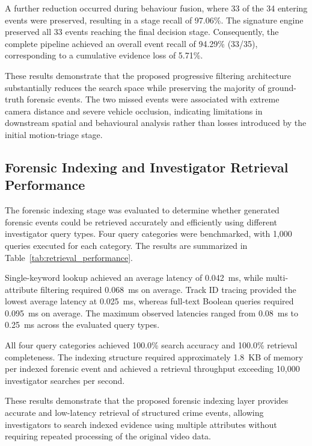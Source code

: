 \documentclass[conference]{IEEEtran}
\begin{document}
A further reduction occurred during behaviour fusion, where 33 of the
34 entering events were preserved, resulting in a stage recall of
97.06\%. The signature engine preserved all 33 events reaching the final
decision stage. Consequently, the complete pipeline achieved an overall
event recall of 94.29\% (33/35), corresponding to a cumulative evidence
loss of 5.71\%.

These results demonstrate that the proposed progressive filtering
architecture substantially reduces the search space while preserving
the majority of ground-truth forensic events. The two missed events were
associated with extreme camera distance and severe vehicle occlusion,
indicating limitations in downstream spatial and behavioural analysis
rather than losses introduced by the initial motion-triage stage.

\subsection{Forensic Indexing and Investigator Retrieval Performance}

The forensic indexing stage was evaluated to determine whether generated
forensic events could be retrieved accurately and efficiently using
different investigator query types. Four query categories were
benchmarked, with 1,000 queries executed for each category. The results
are summarized in Table~\ref{tab:retrieval_performance}.

Single-keyword lookup achieved an average latency of 0.042~ms, while
multi-attribute filtering required 0.068~ms on average. Track ID tracing
provided the lowest average latency at 0.025~ms, whereas full-text
Boolean queries required 0.095~ms on average. The maximum observed
latencies ranged from 0.08~ms to 0.25~ms across the evaluated query
types.

All four query categories achieved 100.0\% search accuracy and 100.0\%
retrieval completeness. The indexing structure required approximately
1.8~KB of memory per indexed forensic event and achieved a retrieval
throughput exceeding 10,000 investigator searches per second.

These results demonstrate that the proposed forensic indexing layer
provides accurate and low-latency retrieval of structured crime events,
allowing investigators to search indexed evidence using multiple
attributes without requiring repeated processing of the original video
data.
\end{document}
